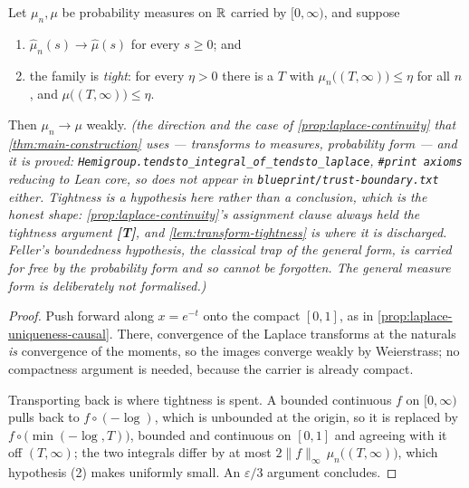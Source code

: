 \begin{proposition}\label{prop:laplace-continuity-causal}
\leanok
Let $\mu_n, \mu$ be probability measures on $\mathbb{R}$ carried by $[0,\infty)$, and suppose
\begin{enumerate}
\item $\hat\mu_n(s) \to \hat\mu(s)$ for every $s \ge 0$; and
\item the family is \emph{tight}: for every $\eta > 0$ there is a $T$ with
$\mu_n\bigl((T,\infty)\bigr) \le \eta$ for all $n$, and $\mu\bigl((T,\infty)\bigr) \le \eta$.
\end{enumerate}
Then $\mu_n \to \mu$ weakly.
\statusT\quad\emph{(the direction and the case of \ref{prop:laplace-continuity} that
\ref{thm:main-construction} uses --- transforms to measures, probability form --- and it is
\emph{proved}: \texttt{Hemigroup.tendsto\_integral\_of\_tendsto\_laplace},
\texttt{\#print axioms} reducing to Lean core, so  does not appear in
\texttt{blueprint/trust-boundary.txt} either. Tightness is a \emph{hypothesis} here rather than a
conclusion, which is the honest shape: \ref{prop:laplace-continuity}'s assignment clause always
held the tightness argument \textbf{[T]}, and \ref{lem:transform-tightness} is where it is
discharged. Feller's boundedness hypothesis, the classical trap of the general form, is carried
for free by the probability form and so cannot be forgotten. The general measure form is
deliberately not formalised.)}
\end{proposition}

\begin{proof}
\leanok
Push forward along $x = e^{-t}$ onto the compact $[0,1]$, as in
\ref{prop:laplace-uniqueness-causal}. There, convergence of the Laplace transforms at the
naturals \emph{is} convergence of the moments, so the images converge weakly by Weierstrass; no
compactness argument is needed, because the carrier is already compact.

Transporting back is where tightness is spent. A bounded continuous $f$ on $[0,\infty)$ pulls
back to $f \circ (-\log)$, which is unbounded at the origin, so it is replaced by
$f \circ \bigl(\min(-\log, T)\bigr)$, bounded and continuous on $[0,1]$ and agreeing with it off
$(T,\infty)$; the two integrals differ by at most $2\|f\|_\infty\,\mu_n\bigl((T,\infty)\bigr)$,
which hypothesis (2) makes uniformly small. An $\varepsilon/3$ argument concludes.
\end{proof}

